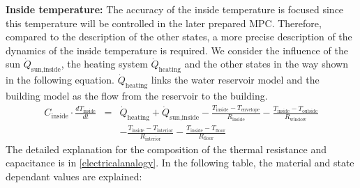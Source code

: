     \textbf{Inside temperature:}\newline
    The accuracy of the inside temperature is focused since this temperature will be controlled in the later prepared MPC. Therefore, compared to the description of the other states, a more precise description of the dynamics of the inside temperature is required. We consider the influence of the sun $\dot{Q}_\text{sun,inside}$, the heating system $\dot{Q}_\text{heating}$ and the other states in the way shown in the following equation. $\dot{Q}_\text{heating}$ links the water reservoir model and the building model as the flow from the reservoir to the building. 
    \begin{align}
        \label{eq:1.state}
        C_\text{inside}\cdot \frac{d T_\text{inside}}{d t} &=& \dot{Q}_\text{heating} + \dot{Q}_\text{sun,inside} - \frac{T_\text{inside}-T_\text{envelope}}{R_\text{inside}} - \frac{T_\text{inside}-T_\text{outside}}{R_\text{window}} \\
       & &-\frac{T_\text{inside}-T_\text{interior}}{R_\text{interior}}-\frac{T_\text{inside}-T_\text{floor}}{R_\text{floor}}\nonumber
    \end{align}
    The detailed explanation for the composition of the thermal resistance and capacitance is in \autoref{electricalanalogy}. In the following table, the material and state dependant values are explained:
